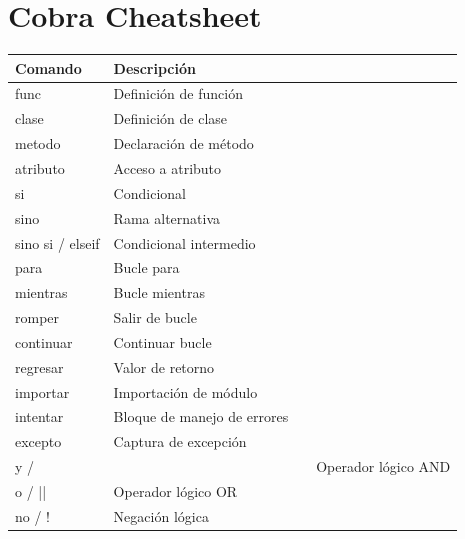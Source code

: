 \documentclass{article}
\begin{document}
\section*{Cobra Cheatsheet}
\begin{tabular}{ll}
\textbf{Comando} & \textbf{Descripción}\\\hline
func & Definición de función\\
clase & Definición de clase\\
metodo & Declaración de método\\
atributo & Acceso a atributo\\
si & Condicional\\
sino & Rama alternativa\\
sino si / elseif & Condicional intermedio\\
para & Bucle para\\
mientras & Bucle mientras\\
romper & Salir de bucle\\
continuar & Continuar bucle\\
regresar & Valor de retorno\\
importar & Importación de módulo\\
intentar & Bloque de manejo de errores\\
excepto & Captura de excepción\\
y / && & Operador lógico AND\\
o / || & Operador lógico OR\\
no / ! & Negación lógica\\
\end{tabular}
\end{document}
